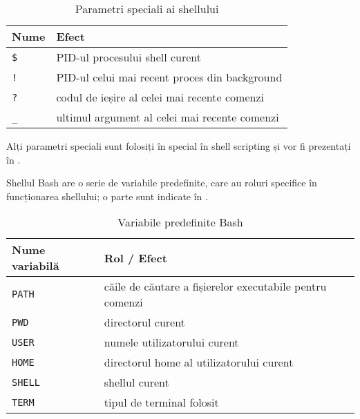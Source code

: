 \begin{table}[!htb]
  \caption{Parametri speciali ai shellului}
  \begin{center}
    \begin{tabular}{ p{} p{} }
      \toprule
        \textbf{Nume} &
        \textbf{Efect} \\
      \midrule
        \texttt{\$} &
        PID-ul procesului shell curent \\
      \midrule
        \texttt{!} &
        PID-ul celui mai recent proces din background \\
      \midrule
        \texttt{?} &
        codul de ieșire al celei mai recente comenzi \\
      \midrule
        \texttt{\_} &
        ultimul argument al celei mai recente comenzi \\
      \bottomrule
    \end{tabular}
    \label{tab:cli:special-shell-vars}
  \end{center}
\end{table}

Alți parametri speciali sunt folosiți în special în shell scripting și vor fi prezentați în .

Shellul Bash are o serie de variabile predefinite, care au roluri specifice în funcționarea shellului;
o parte sunt indicate în .

\begin{table}[!htb]
  \caption{Variabile predefinite Bash}
  \begin{center}
    \begin{tabular}{ p{} p{} }
      \toprule
        \textbf{Nume variabilă} &
        \textbf{Rol / Efect} \\
      \midrule
        \texttt{PATH} &
        căile de căutare a fișierelor executabile pentru comenzi \\
      \midrule
        \texttt{PWD} &
        directorul curent \\
      \midrule
        \texttt{USER} &
        numele utilizatorului curent \\
      \midrule
        \texttt{HOME} &
        directorul home al utilizatorului curent \\
      \midrule
        \texttt{SHELL} &
        shellul curent \\
      \midrule
        \texttt{TERM} &
        tipul de terminal folosit \\
      \bottomrule
    \end{tabular}
    \label{tab:cli:shell-vars}
  \end{center}
\end{table}

